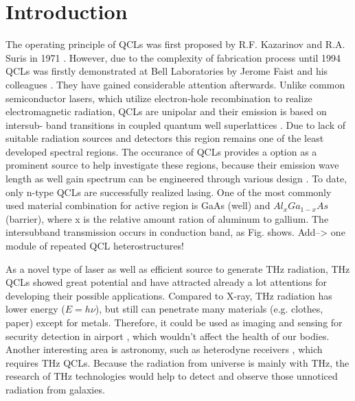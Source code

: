 \documentclass[11pt,final]{scrbook}
\begin{document}
\tableofcontents

\chapter{Introduction}
The operating principle of QCLs was first proposed by R.F. Kazarinov and R.A. Suris in 1971 \cite{kazarinov1971possibility}. However, due to the complexity of fabrication process until 1994 QCLs was firstly demonstrated at Bell Laboratories by Jerome Faist and his colleagues \cite{faist1994quantum}. They have gained considerable attention afterwards. Unlike common semiconductor lasers, which utilize electron-hole recombination to realize electromagnetic radiation, QCLs are unipolar and their emission is based on intersub- band transitions in coupled quantum well superlattices \cite{williams2007terahertz}. Due to lack of suitable radiation sources and detectors this region remains one of the least developed spectral regions. The occurance of QCLs provides a option as a prominent source to help investigate these regions, because their emission wave length as well gain spectrum can be engineered through various design \cite{gmachl2002ultra}. To date, only n-type QCLs are successfully realized lasing.  One of the most commonly used material combination for active region is GaAs (well) and $Al_{x}Ga_{1-x}As$ (barrier), where x is the relative amount ration of aluminum to gallium. The intersubband transmission occurs in conduction band, as Fig. shows. Add--> one module of repeated QCL heterostructures!

As a novel type of laser as well as efficient source to generate THz radiation, THz QCLs showed great potential and have attracted already a lot attentions for developing their possible applications. Compared to X-ray, THz radiation has lower energy ($E=h\nu$), but still can penetrate many materials (e.g. clothes, paper) except for metals. Therefore, it could be used as imaging and sensing for security detection in airport \cite{federici2005thz}, which wouldn't affect the health of our bodies. Another interesting area is astronomy, such as heterodyne receivers \cite{williams2007terahertz}, which requires THz QCLs. Because the radiation from universe is mainly with THz, the research of THz technologies would help to detect and observe those unnoticed radiation from galaxies. 
\end{document}
